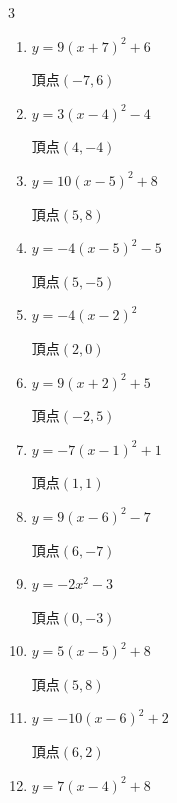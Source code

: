 \begin{multicols}{3}
\begin{enumerate}
  \item $\displaystyle y=9\left( x+7\right)^{2}+6$

        $\displaystyle 頂点\left( -7 , 6 \right)$

  \item $\displaystyle y=3\left( x-4\right)^{2}-4$

        $\displaystyle 頂点\left( 4 , -4 \right)$

  \item $\displaystyle y=10\left( x-5\right)^{2}+8$

        $\displaystyle 頂点\left( 5 , 8 \right)$

\columnbreak %

  \item $\displaystyle y=-4\left( x-5\right)^{2}-5$

        $\displaystyle 頂点\left( 5 , -5 \right)$

  \item $\displaystyle y=-4\left( x-2\right)^{2}$

        $\displaystyle 頂点\left( 2 , 0 \right)$

  \item $\displaystyle y=9\left( x+2\right)^{2}+5$

        $\displaystyle 頂点\left( -2 , 5 \right)$

  \item $\displaystyle y=-7\left( x-1\right)^{2}+1$

        $\displaystyle 頂点\left( 1 , 1 \right)$

  \item $\displaystyle y=9\left( x-6\right)^{2}-7$

        $\displaystyle 頂点\left( 6 , -7 \right)$

  \item $\displaystyle y=-2x^{2}-3$

        $\displaystyle 頂点\left( 0 , -3 \right)$

  \item $\displaystyle y=5\left( x-5\right)^{2}+8$

        $\displaystyle 頂点\left( 5 , 8 \right)$

  \item $\displaystyle y=-10\left( x-6\right)^{2}+2$

        $\displaystyle 頂点\left( 6 , 2 \right)$

  \item $\displaystyle y=7\left( x-4\right)^{2}+8$


\end{enumerate}
\end{multicols}
